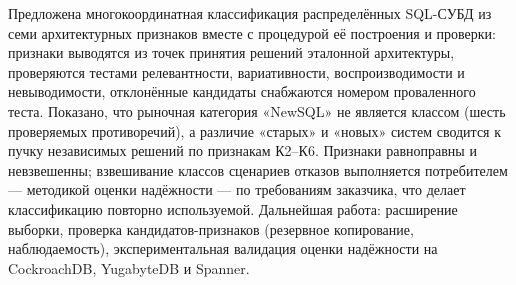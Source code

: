 \documentclass{misisarticle}
\begin{document}
Предложена многокоординатная классификация распределённых SQL-СУБД из семи архитектурных признаков вместе с процедурой её построения и проверки: признаки выводятся из точек принятия решений эталонной архитектуры, проверяются тестами релевантности, вариативности, воспроизводимости и невыводимости, отклонённые кандидаты снабжаются номером проваленного теста. Показано, что рыночная категория «NewSQL» не является классом (шесть проверяемых противоречий), а различие «старых» и «новых» систем сводится к пучку независимых решений по признакам К2--К6. Признаки равноправны и невзвешенны; взвешивание классов сценариев отказов выполняется потребителем --- методикой оценки надёжности --- по требованиям заказчика, что делает классификацию повторно используемой. Дальнейшая работа: расширение выборки, проверка кандидатов-признаков (резервное копирование, наблюдаемость), экспериментальная валидация оценки надёжности на CockroachDB, YugabyteDB и Spanner.
\end{document}
